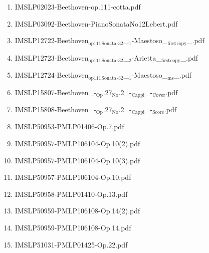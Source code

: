 \documentclass[11pt]{article}
\begin{document}
\begin{enumerate}
\begin{enumerate}
\begin{enumerate}
\item IMSLP02023-Beethoven-op.111-cotta.pdf
\label{sec-1-1-1-1-44-9-6-7-5}

\item IMSLP03092-Beethoven-PianoSonataNo12Lebert.pdf
\label{sec-1-1-1-1-44-9-6-7-6}

\item IMSLP12722-Beethoven$_{\text{op111}}$$_{\text{Sonata}}$$_{\text{-32}}$\_$_{\text{1}}$-Maestoso\_$_{\text{first}}$$_{\text{copy}}$\_.pdf
\label{sec-1-1-1-1-44-9-6-7-7}

\item IMSLP12723-Beethoven$_{\text{op111}}$$_{\text{Sonata}}$$_{\text{-32}}$\_$_{\text{2}}$-Arietta\_$_{\text{first}}$$_{\text{copy}}$\_.pdf
\label{sec-1-1-1-1-44-9-6-7-8}

\item IMSLP12724-Beethoven$_{\text{op111}}$$_{\text{Sonata}}$$_{\text{-32}}$\_$_{\text{1}}$-Maestoso\_$_{\text{ms}}$\_.pdf
\label{sec-1-1-1-1-44-9-6-7-9}

\item IMSLP15807-Beethoven\_-$_{\text{Op}}$.27$_{\text{No}}$.2\_-$_{\text{Cappi}}$\_-$_{\text{Cover}}$.pdf
\label{sec-1-1-1-1-44-9-6-7-10}

\item IMSLP15808-Beethoven\_-$_{\text{Op}}$.27$_{\text{No}}$.2\_-$_{\text{Cappi}}$\_-$_{\text{Score}}$.pdf
\label{sec-1-1-1-1-44-9-6-7-11}

\item IMSLP50953-PMLP01406-Op.7.pdf
\label{sec-1-1-1-1-44-9-6-7-12}

\item IMSLP50957-PMLP106104-Op.10(2).pdf
\label{sec-1-1-1-1-44-9-6-7-13}

\item IMSLP50957-PMLP106104-Op.10(3).pdf
\label{sec-1-1-1-1-44-9-6-7-14}

\item IMSLP50957-PMLP106104-Op.10.pdf
\label{sec-1-1-1-1-44-9-6-7-15}

\item IMSLP50958-PMLP01410-Op.13.pdf
\label{sec-1-1-1-1-44-9-6-7-16}

\item IMSLP50959-PMLP106108-Op.14(2).pdf
\label{sec-1-1-1-1-44-9-6-7-17}

\item IMSLP50959-PMLP106108-Op.14.pdf
\label{sec-1-1-1-1-44-9-6-7-18}

\item IMSLP51031-PMLP01425-Op.22.pdf
\label{sec-1-1-1-1-44-9-6-7-19}


\end{enumerate}
\end{enumerate}
\end{enumerate}
\end{document}
